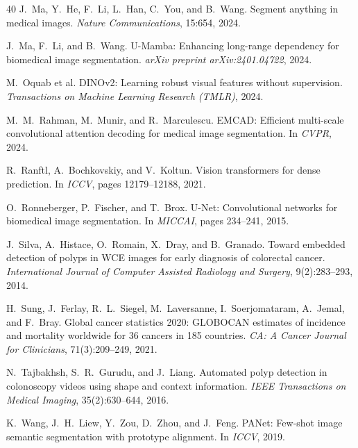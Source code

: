 \documentclass[10pt,twocolumn]{article}
\begin{document}
\begin{thebibliography}{40}
J.~Ma, Y.~He, F.~Li, L.~Han, C.~You, and B.~Wang.
\newblock Segment anything in medical images.
\newblock \emph{Nature Communications}, 15:654, 2024.

J.~Ma, F.~Li, and B.~Wang.
\newblock U-Mamba: Enhancing long-range dependency for biomedical image segmentation.
\newblock \emph{arXiv preprint arXiv:2401.04722}, 2024.

M.~Oquab et al.
\newblock DINOv2: Learning robust visual features without supervision.
\newblock \emph{Transactions on Machine Learning Research (TMLR)}, 2024.

M.~M.~Rahman, M.~Munir, and R.~Marculescu.
\newblock EMCAD: Efficient multi-scale convolutional attention decoding for medical image segmentation.
\newblock In \emph{CVPR}, 2024.

R.~Ranftl, A.~Bochkovskiy, and V.~Koltun.
\newblock Vision transformers for dense prediction.
\newblock In \emph{ICCV}, pages 12179--12188, 2021.

O.~Ronneberger, P.~Fischer, and T.~Brox.
\newblock U-Net: Convolutional networks for biomedical image segmentation.
\newblock In \emph{MICCAI}, pages 234--241, 2015.

J.~Silva, A.~Histace, O.~Romain, X.~Dray, and B.~Granado.
\newblock Toward embedded detection of polyps in WCE images for early diagnosis of colorectal cancer.
\newblock \emph{International Journal of Computer Assisted Radiology and Surgery}, 9(2):283--293, 2014.

H.~Sung, J.~Ferlay, R.~L.~Siegel, M.~Laversanne, I.~Soerjomataram, A.~Jemal, and F.~Bray.
\newblock Global cancer statistics 2020: GLOBOCAN estimates of incidence and mortality worldwide for 36 cancers in 185 countries.
\newblock \emph{CA: A Cancer Journal for Clinicians}, 71(3):209--249, 2021.

N.~Tajbakhsh, S.~R.~Gurudu, and J.~Liang.
\newblock Automated polyp detection in colonoscopy videos using shape and context information.
\newblock \emph{IEEE Transactions on Medical Imaging}, 35(2):630--644, 2016.

K.~Wang, J.~H.~Liew, Y.~Zou, D.~Zhou, and J.~Feng.
\newblock PANet: Few-shot image semantic segmentation with prototype alignment.
\newblock In \emph{ICCV}, 2019.


\end{thebibliography}
\end{document}
